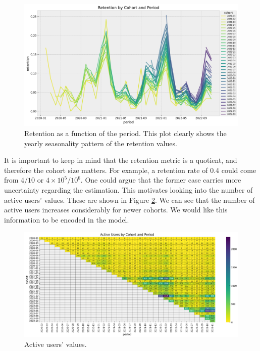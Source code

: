 \documentclass[11pt]{amsart}
\theoremstyle{definition}
\begin{document}
\begin{figure}
    \centering
    \includegraphics[width=\textwidth]{images/revenue_retention_19_0.png}
    \caption{Retention as a function of the period. This plot clearly shows the yearly
    seasonality pattern of the retention values.}
    \label{fig:retention_seasonal}
\end{figure}

It is important to keep in mind that the retention metric is a quotient, and therefore
the cohort size matters. For example, a retention rate of 0.4 could come from $4/10$ or
$4\times 10^{5} / 10^{6}$. One could argue that the former case carries more
uncertainty regarding the estimation. This motivates looking into the number of active
users' values. These are shown in Figure \ref{fig:active_users}. We can see that the
number of active users increases considerably for newer cohorts. We would like this
information to be encoded in the model. \\

\begin{figure}
    \centering
    \includegraphics[width=\textwidth]{images/revenue_retention_21_0.png}
    \caption{Active users' values.}
    \label{fig:active_users}
\end{figure}
\end{document}
